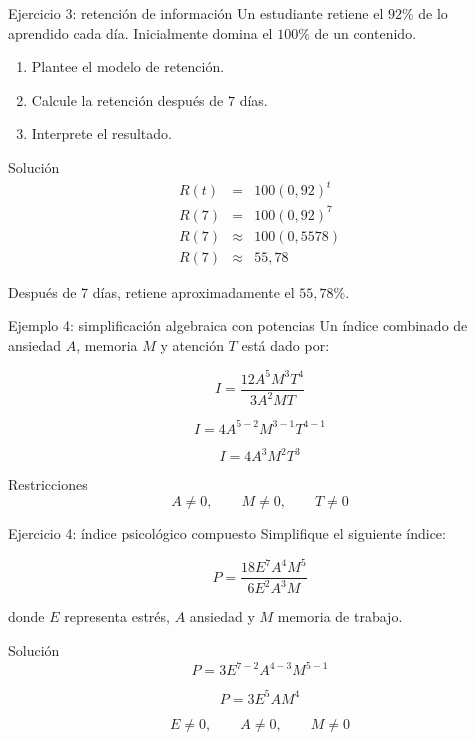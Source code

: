 \documentclass[handout,aspectratio=169]{beamer}
\begin{document}
	\begin{frame}{Ejercicio 3: retención de información}
		Un estudiante retiene el \(92\%\) de lo aprendido cada día. Inicialmente domina el \(100\%\) de un contenido.
		
		\begin{enumerate}
			\item Plantee el modelo de retención.
			\item Calcule la retención después de \(7\) días.
			\item Interprete el resultado.
		\end{enumerate}
		
		\pause
		
		\begin{block}{Solución}
			\[
			\begin{array}{rcl}
				R(t)   & = & 100(0{,}92)^t \\[0.3cm]
				R(7)   & = & 100(0{,}92)^7 \\[0.3cm]
				R(7)   & \approx & 100(0{,}5578) \\[0.3cm]
				R(7)   & \approx & 55{,}78
			\end{array}
			\]
			
			Después de 7 días, retiene aproximadamente el \(55{,}78\%\).
		\end{block}
	\end{frame}
	
	\begin{frame}{Ejemplo 4: simplificación algebraica con potencias}
		Un índice combinado de ansiedad \(A\), memoria \(M\) y atención \(T\) está dado por:
		
		\[
		I=\frac{12A^5M^3T^4}{3A^2MT}
		\]
		
		\[
		I=4A^{5-2}M^{3-1}T^{4-1}
		\]
		
		\[
		I=4A^3M^2T^3
		\]
		
		\begin{block}{Restricciones}
			\[
			A\neq 0,\qquad M\neq 0,\qquad T\neq 0
			\]
		\end{block}
	\end{frame}
	
	\begin{frame}{Ejercicio 4: índice psicológico compuesto}
		Simplifique el siguiente índice:
		
		\[
		P=\frac{18E^7A^4M^5}{6E^2A^3M}
		\]
		
		donde \(E\) representa estrés, \(A\) ansiedad y \(M\) memoria de trabajo.
		
		\pause
		
		\begin{block}{Solución}
			\[
			P=3E^{7-2}A^{4-3}M^{5-1}
			\]
			
			\[
			P=3E^5AM^4
			\]
			
			\[
			E\neq 0,\qquad A\neq 0,\qquad M\neq 0
			\]
		\end{block}
	\end{frame}
	
\end{document}
